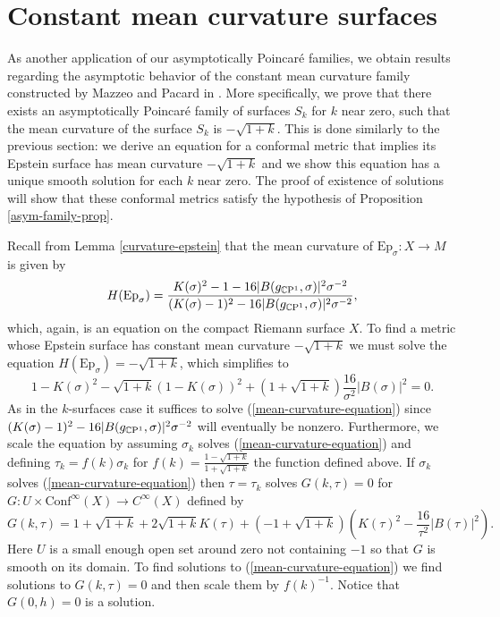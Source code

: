 \section{Constant mean curvature surfaces}


As another application of our asymptotically Poincar\'e families, we obtain results regarding the asymptotic behavior of the constant mean curvature family constructed by Mazzeo and Pacard in \cite{mazzeo-pacard2011}. 
More specifically, we prove that there exists an asymptotically Poincar\'e family of surfaces $S_k$ for $k$ near zero, such that the mean curvature of the surface $S_k$ is $-\sqrt{1+k}$. 
This is done similarly to the previous section: we derive an equation for a conformal metric that implies its Epstein surface has mean curvature $-\sqrt{1+k}$ and we show this equation has a unique smooth solution for each $k$ near zero. 
The proof of existence of solutions will show that these conformal metrics satisfy the hypothesis of Proposition \ref{asym-family-prop}.


Recall from Lemma \ref{curvature-epstein} that the mean curvature of $\mathrm{Ep}_\sigma: X \to M$ is given by 
\[
H(\mathrm{Ep}_\sigma)
= \frac{K(\sigma)^2 - 1 - 16|B(g_{\mathbb{C}\mathrm{P}^1},\sigma)|^2\sigma^{-2}}{(K(\sigma) - 1)^2 - 16|B(g_{\mathbb{C}\mathrm{P}^1},\sigma)|^2\sigma^{-2}},
\]
which, again, is an equation on the compact Riemann surface $X$.
To find a metric whose Epstein surface has constant mean curvature $-\sqrt{1+k}$ we must solve the equation $H(\mathrm{Ep}_\sigma) = -\sqrt{1+k}$, which simplifies to
\begin{equation}
\label{mean-curvature-equation}
1-K(\sigma)^2 - \sqrt{1+k}(1-K(\sigma))^2 + (1 + \sqrt{1+k})\frac{16}{\sigma^2}|B(\sigma)|^2 = 0.
\end{equation}
As in the $k$-surfaces case it suffices to solve (\ref{mean-curvature-equation}) since $(K(\sigma) - 1)^2 - 16|B(g_{\mathbb{C}\mathrm{P}^1},\sigma)|^2\sigma^{-2}$ will eventually be nonzero.
Furthermore, we scale the equation by assuming $\sigma_k$ solves (\ref{mean-curvature-equation}) and defining $\tau_k = f(k) \sigma_k$ for $f(k) = \frac{1-\sqrt{1+k}}{1+\sqrt{1+k}}$ the function defined above. 
If $\sigma_k$ solves (\ref{mean-curvature-equation}) then $\tau = \tau_k$ solves $G(k,\tau) = 0$ for $G: U \times \mathrm{Conf}^\infty(X) \to C^\infty(X)$ defined by 
\[
G(k,\tau) = 1+\sqrt{1+k} + 2\sqrt{1+k}K(\tau) + (-1 + \sqrt{1+k})(K(\tau)^2 - \frac{16}{\tau^2}|B(\tau)|^2).
\]
Here $U$ is a small enough open set around zero not containing $-1$ so that $G$ is smooth on its domain.
To find solutions to (\ref{mean-curvature-equation}) we find solutions to $G(k,\tau) = 0$ and then scale them by $f(k)^{-1}$. 
Notice that $G(0,h) = 0$ is a solution. 

